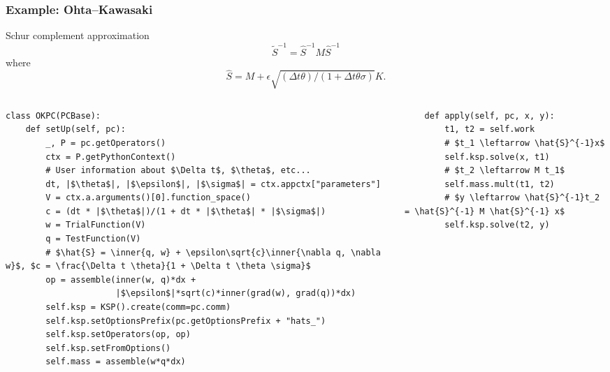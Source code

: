 \documentclass[presentation,aspectratio=43, 10pt]{beamer}
\newcommand{\inner}[1]{\left\langle #1 \right \rangle}
\begin{document}
\begin{frame}[fragile]
  \frametitle{Example: Ohta--Kawasaki}
  \begin{block}{Schur complement approximation}
    \begin{equation*}
      \tilde{S}^{-1} = \hat{S}^{-1}M\hat{S}^{-1}
    \end{equation*}
    where
    \begin{equation*}
      \hat{S} = M + \epsilon\sqrt{(\Delta t \theta)/(1+\Delta t \theta\sigma)} K.
    \end{equation*}
  \end{block}
  \begin{columns}[T]
    \begin{column}{0.49\textwidth}
\begin{verbatim}
class OKPC(PCBase):
    def setUp(self, pc):
        _, P = pc.getOperators()
        ctx = P.getPythonContext()
        # User information about $\Delta t$, $\theta$, etc...
        dt, |$\theta$|, |$\epsilon$|, |$\sigma$| = ctx.appctx["parameters"]
        V = ctx.a.arguments()[0].function_space()
        c = (dt * |$\theta$|)/(1 + dt * |$\theta$| * |$\sigma$|)
        w = TrialFunction(V)
        q = TestFunction(V)
        # $\hat{S} = \inner{q, w} + \epsilon\sqrt{c}\inner{\nabla q, \nabla w}$, $c = \frac{\Delta t \theta}{1 + \Delta t \theta \sigma}$
        op = assemble(inner(w, q)*dx + 
                      |$\epsilon$|*sqrt(c)*inner(grad(w), grad(q))*dx)
        self.ksp = KSP().create(comm=pc.comm)
        self.ksp.setOptionsPrefix(pc.getOptionsPrefix + "hats_")
        self.ksp.setOperators(op, op)
        self.ksp.setFromOptions()
        self.mass = assemble(w*q*dx)
\end{verbatim}
    \end{column}
    \begin{column}{0.49\textwidth}
\begin{verbatim}
    def apply(self, pc, x, y):
        t1, t2 = self.work
        # $t_1 \leftarrow \hat{S}^{-1}x$
        self.ksp.solve(x, t1)
        # $t_2 \leftarrow M t_1$
        self.mass.mult(t1, t2)
        # $y \leftarrow \hat{S}^{-1}t_2 = \hat{S}^{-1} M \hat{S}^{-1} x$
        self.ksp.solve(t2, y)
\end{verbatim}
    \end{column}
  \end{columns}
\end{frame}
\end{document}
